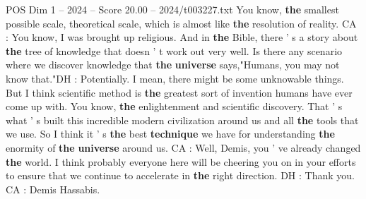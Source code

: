 \begin{textsample}{POS Dim 1 – 2024 – Score 20.00 – 2024/t003227.txt}
You know, \textbf{the} smallest possible scale, theoretical scale, which is almost like \textbf{the} resolution of reality.
CA : You know, I was brought up religious.
And in \textbf{the} Bible, there ' s a story about \textbf{the} tree of knowledge that doesn ' t work out very well.
Is there any scenario where we discover knowledge that \textbf{the} \textbf{universe} says,"Humans, you may not know that."DH : Potentially.
I mean, there might be some unknowable things.
But I think scientific method is \textbf{the} greatest sort of invention humans have ever come up with.
You know, \textbf{the} enlightenment and scientific discovery.
That ' s what ' s built this incredible modern civilization around us and all \textbf{the} tools that we use.
So I think it ' s \textbf{the} best \textbf{technique} we have for understanding \textbf{the} enormity of \textbf{the} \textbf{universe} around us.
CA : Well, Demis, you ' ve already changed \textbf{the} world.
I think probably everyone here will be cheering you on in your efforts to ensure that we continue to accelerate in \textbf{the} right direction.
DH : Thank you.
CA : Demis Hassabis.

\end{textsample}
